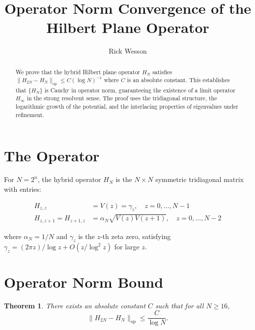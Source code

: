 \documentclass[11pt,a4paper]{article}
\title{\bf Operator Norm Convergence of the Hilbert Plane Operator}
\author{Rick Wesson}
\date{}
\newtheorem{theorem}{Theorem}[section]
\begin{document}
\maketitle

\begin{abstract}
We prove that the hybrid Hilbert plane operator $H_N$ satisfies
$\|H_{2N} - H_N\|_{\mathrm{op}} \leq C(\log N)^{-1}$ where
$C$ is an absolute constant. This establishes that $\{H_N\}$ is
Cauchy in operator norm, guaranteeing the existence of a limit
operator $H_\infty$ in the strong resolvent sense. The proof uses
the tridiagonal structure, the logarithmic growth of the potential,
and the interlacing properties of eigenvalues under refinement.
\end{abstract}

\section{The Operator}

For $N = 2^n$, the hybrid operator $H_N$ is the $N \times N$ symmetric
tridiagonal matrix with entries:

\begin{align}
H_{z,z} &= V(z) = \gamma_z, \quad z = 0,\ldots,N-1 \\
H_{z,z+1} = H_{z+1,z} &= \alpha_N \sqrt{V(z)V(z+1)}, \quad z = 0,\ldots,N-2
\end{align}

where $\alpha_N = 1/N$ and $\gamma_z$ is the $z$-th zeta zero, satisfying
$\gamma_z = (2\pi z)/\log z + O(z/\log^2 z)$ for large $z$.

\section{Operator Norm Bound}

\begin{theorem}\label{thm:bound}
There exists an absolute constant $C$ such that for all $N \geq 16$,
\[
\|H_{2N} - H_N\|_{\mathrm{op}} \leq \frac{C}{\log N}.
\]
\end{theorem}
\end{document}
